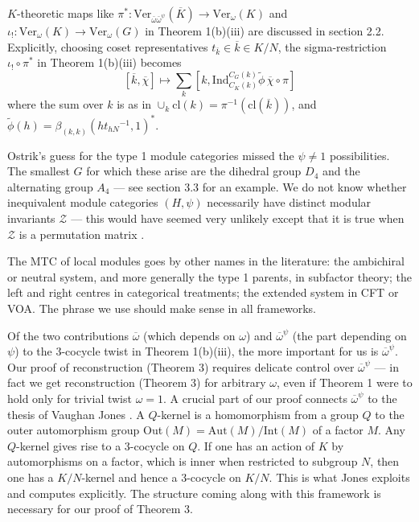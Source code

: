 \documentclass[12pt]{article}
\numberwithin{equation}{section}
\def\cZ            {{\mathcal{Z}}}
\begin{document}
$K$-theoretic maps like $\pi^*:\mathrm{Ver}_{\bar{\omega}\bar{\omega}^\psi}(\overline{K})\rightarrow\mathrm{Ver}_\omega (K)$ and $\iota_!:\mathrm{Ver}_\omega (K)\rightarrow \mathrm{Ver}_\omega (G)$ in Theorem 1(b)(iii) are discussed in section 2.2. Explicitly, choosing coset representatives $t_{\bar{k}}\in\overline{k}\in K/N$, the sigma-restriction $\iota_!\circ\pi^*$ in Theorem 1(b)(iii)  becomes
\begin{equation}\label{sigresgen}
[\overline{k},\overline{\chi}]\mapsto\sum_k[k,\mathrm{Ind}_{C_K(k)}^{C_G(k)}\tilde{\phi}\,\overline{\chi}\circ\pi]\end{equation}
where  the sum over $k$ is as in $\cup_k\mathrm{cl}(k)=\pi^{-1}(\mathrm{cl}(\overline{k}))$, and $\widetilde{\phi}(h)=\beta_{(k,k)}(ht_{hN}{}^{-1},1)^*$. 

 Ostrik's guess \cite{Ost} for the type 1 module categories missed the $\psi\ne 1$ possibilities. The smallest $G$ for which these arise are the dihedral group $D_4$ and the alternating group $A_4$ --- see section 3.3 for an example.
We do not know whether inequivalent module categories $(H,\psi)$ necessarily have
distinct modular invariants $\cZ$ --- this would have seemed very unlikely except that it is true when $\cZ$
is a permutation matrix \cite{EG8}.

The MTC of local modules goes by other names in the literature: the ambichiral or neutral system, and  more generally the type 1 parents, in subfactor theory; the left and right centres in categorical treatments; the extended system in CFT or VOA. The phrase we use should make sense in all frameworks. 

Of the two contributions $\overline{\omega}$ (which depends on $\omega$) and $\overline{\omega}^\psi$ (the part depending on $\psi$) to the 3-cocycle twist in
Theorem 1(b)(iii), the more important for us is $\overline{\omega}^\psi$. Our proof of reconstruction (Theorem 3)
requires delicate control over $\overline{\omega}^\psi$ --- in fact we get reconstruction (Theorem 3) for arbitrary $\omega$,
even if Theorem 1 were to hold  only for trivial twist $\omega=1$. A crucial part of our proof connects $\overline{\omega}^\psi$ to the thesis of Vaughan Jones \cite{Jon2}.
A $Q$-kernel is a homomorphism  from a group $Q$ to the outer automorphism group Out$(M) = \mathrm{Aut} (M)/\mathrm{Int} (M)$  of a factor $M$. Any $Q$-kernel  gives rise to a 3-cocycle on  $Q$. If one has an action of $K$ by automorphisms on  a factor, which is inner when restricted to subgroup $N$,
then one has a $K/N$-kernel and hence  a 3-cocycle on $K/N$.
This is what Jones exploits and computes explicitly. The structure coming along with this framework is necessary for our proof of Theorem 3.
\end{document}
